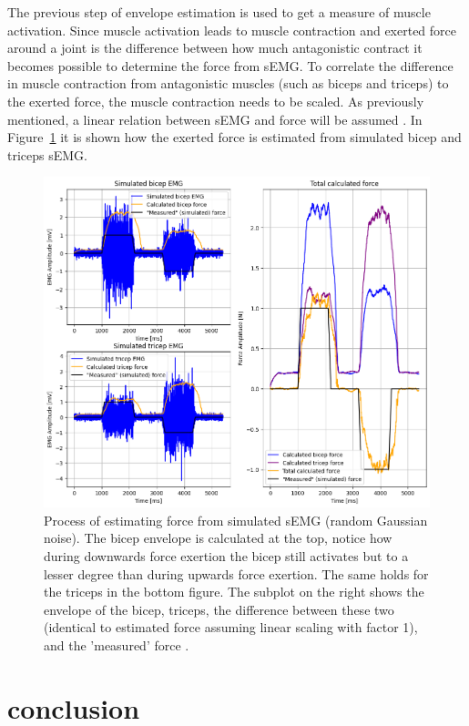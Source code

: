 The previous step of envelope estimation is used to get a measure of muscle activation. Since muscle activation leads to muscle contraction and exerted force around a joint is the difference between how much antagonistic contract \cite{human_robotics} it becomes possible to determine the force from sEMG. To correlate the difference in muscle contraction from antagonistic muscles (such as biceps and triceps) to the exerted force, the muscle contraction needs to be scaled. As previously mentioned, a linear relation between sEMG and force will be assumed \cite{adaptive_filter_dry_electrode} \cite{interpreting_muscle_function_from_emg}. In Figure~\ref{fig:force_simulation} it is shown how the exerted force is estimated from simulated bicep and triceps sEMG. 

\begin{figure}[h!t]
	\begin{center}
		\includegraphics[width=1.0\columnwidth]{images/force_simulation.png}
	\end{center}
	\caption{Process of estimating force from simulated sEMG (random Gaussian noise). The bicep envelope is calculated at the top, notice how during downwards force exertion the bicep still activates but to a lesser degree than during upwards force exertion. The same holds for the triceps in the bottom figure. The subplot on the right shows the envelope of the bicep, triceps, the difference between these two (identical to estimated force assuming linear scaling with factor 1), and the 'measured' force .}
	\label{fig:force_simulation}
\end{figure}

\section{conclusion}